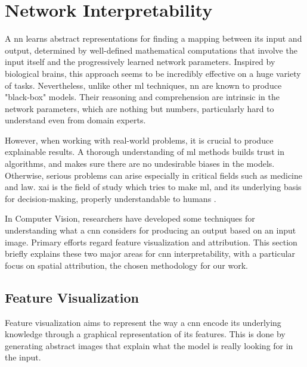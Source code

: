 \section{Network Interpretability}
\label{sec:network-interpretability}


A \gls{nn} learns abstract representations for finding a mapping between its input and output, determined by well-defined mathematical computations that involve the input itself and the progressively learned network parameters. Inspired by biological brains, this approach seems to be incredibly effective on a huge variety of tasks. Nevertheless, unlike other \gls{ml} techniques, \gls{nn} are known to produce "black-box" models. Their reasoning and comprehension are intrinsic in the network parameters, which are nothing but numbers, particularly hard to understand even from domain experts. 

However, when working with real-world problems, it is crucial to produce explainable results. A thorough understanding of \gls{ml} methods builds trust in algorithms, and makes sure there are no undesirable biases in the models. Otherwise, serious problems can arise especially in critical fields such as medicine and law. \gls{xai} is the field of study which tries to make \gls{ml}, and its underlying basis for decision-making, properly understandable to humans \cite{xai-wiki}.

In Computer Vision, researchers have developed some techniques for understanding what a \gls{cnn} considers for producing an output based on an input image. Primary efforts regard feature visualization and attribution. This section briefly explains these two major areas for \gls{cnn} interpretability, with a particular focus on spatial attribution, the chosen methodology for our work.



\subsection{Feature Visualization}
\label{subsec:feature-vis}


Feature visualization aims to represent the way a \gls{cnn} encode its underlying knowledge through a graphical representation of its features. This is done by generating abstract images that explain what the model is really looking for in the input. 

